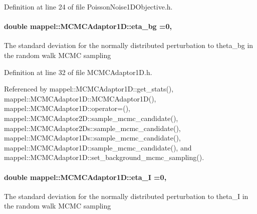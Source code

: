 Definition at line 24 of file Poisson\+Noise1\+D\+Objective.\+h.

\paragraph[{\texorpdfstring{eta\+\_\+bg}{eta_bg}}]{\setlength{\rightskip}{0pt plus 5cm}double mappel\+::\+M\+C\+M\+C\+Adaptor1\+D\+::eta\+\_\+bg =0\hspace{0.3cm}{\ttfamily [protected]}, {\ttfamily [inherited]}}\hypertarget{classmappel_1_1MCMCAdaptor1D_af54c93421b8e298289cbb92743c6b3d5}{}\label{classmappel_1_1MCMCAdaptor1D_af54c93421b8e298289cbb92743c6b3d5}
The standard deviation for the normally distributed perturbation to theta\+\_\+bg in the random walk M\+C\+MC sampling 

Definition at line 32 of file M\+C\+M\+C\+Adaptor1\+D.\+h.



Referenced by mappel\+::\+M\+C\+M\+C\+Adaptor1\+D\+::get\+\_\+stats(), mappel\+::\+M\+C\+M\+C\+Adaptor1\+D\+::\+M\+C\+M\+C\+Adaptor1\+D(), mappel\+::\+M\+C\+M\+C\+Adaptor1\+D\+::operator=(), mappel\+::\+M\+C\+M\+C\+Adaptor2\+D\+::sample\+\_\+mcmc\+\_\+candidate(), mappel\+::\+M\+C\+M\+C\+Adaptor2\+Ds\+::sample\+\_\+mcmc\+\_\+candidate(), mappel\+::\+M\+C\+M\+C\+Adaptor1\+Ds\+::sample\+\_\+mcmc\+\_\+candidate(), mappel\+::\+M\+C\+M\+C\+Adaptor1\+D\+::sample\+\_\+mcmc\+\_\+candidate(), and mappel\+::\+M\+C\+M\+C\+Adaptor1\+D\+::set\+\_\+background\+\_\+mcmc\+\_\+sampling().

\paragraph[{\texorpdfstring{eta\+\_\+I}{eta_I}}]{\setlength{\rightskip}{0pt plus 5cm}double mappel\+::\+M\+C\+M\+C\+Adaptor1\+D\+::eta\+\_\+I =0\hspace{0.3cm}{\ttfamily [protected]}, {\ttfamily [inherited]}}\hypertarget{classmappel_1_1MCMCAdaptor1D_a5780d326be0c40e10d6c91777cfffbd3}{}\label{classmappel_1_1MCMCAdaptor1D_a5780d326be0c40e10d6c91777cfffbd3}
The standard deviation for the normally distributed perturbation to theta\+\_\+I in the random walk M\+C\+MC sampling 

